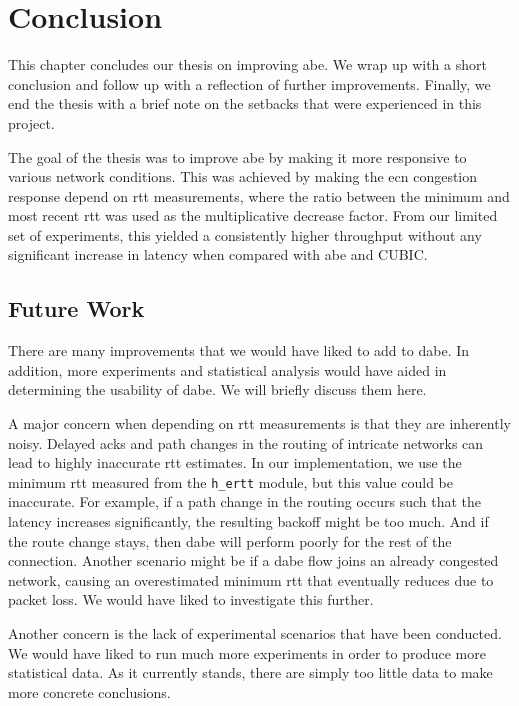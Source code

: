 \chapter{Conclusion} \label{ch:conclusion}

This chapter concludes our thesis on improving \gls{abe}. We wrap up with a short conclusion and follow up with a reflection of further improvements. Finally, we end the thesis with a brief note on the setbacks that were experienced in this project.


The goal of the thesis was to improve \gls{abe} by making it more responsive to various network conditions. This was achieved by making the \gls{ecn} congestion response depend on \gls{rtt} measurements, where the ratio between the minimum and most recent \gls{rtt} was used as the multiplicative decrease factor. From our limited set of experiments, this yielded a consistently higher throughput without any significant increase in latency when compared with \gls{abe} and CUBIC.









\section{Future Work}

There are many improvements that we would have liked to add to \gls{dabe}. In addition, more experiments and statistical analysis would have aided in determining the usability of \gls{dabe}. We will briefly discuss them here.

A major concern when depending on \gls{rtt} measurements is that they are inherently noisy. Delayed \gls{ack}s and path changes in the routing of intricate networks can lead to highly inaccurate \gls{rtt} estimates. In our implementation, we use the minimum \gls{rtt} measured from the \lstinline{h_ertt} module, but this value could be inaccurate. For example, if a path change in the routing occurs such that the latency increases significantly, the resulting backoff might be too much. And if the route change stays, then \gls{dabe} will perform poorly for the rest of the connection. Another scenario might be if a \gls{dabe} flow joins an already congested network, causing an overestimated minimum \gls{rtt} that eventually reduces due to packet loss. We would have liked to investigate this further.

Another concern is the lack of experimental scenarios that have been conducted. We would have liked to run much more experiments in order to produce more statistical data. As it currently stands, there are simply too little data to make more concrete conclusions.










